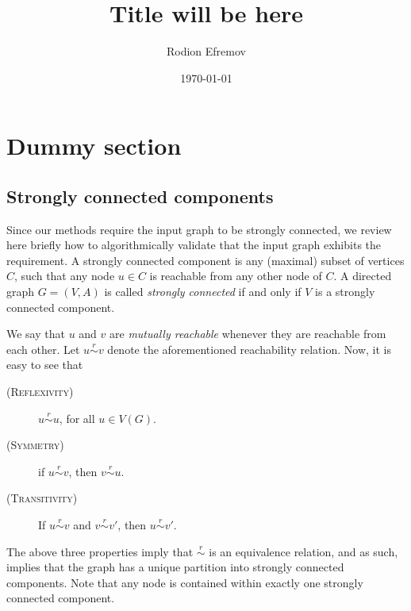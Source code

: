 \documentclass[english]{tktltiki2}
\title{Title will be here}
\author{Rodion Efremov}
\date{\today}
\theoremstyle{definition}
\theoremstyle{remark}
\begin{document}

\frontmatter      %

\maketitle        %
\makeabstract     %

\tableofcontents  %


\mainmatter       %

%
%
% 
%

\section*{Dummy section}

\subsection{Strongly connected components}
Since our methods require the input graph to be strongly connected, we review here briefly how to algorithmically validate that the input graph exhibits the requirement. A strongly connected component is any (maximal) subset of vertices $C$, such that any node $u \in C$ is reachable from any other node of $C$. A directed graph $G = (V, A)$ is called \textit{strongly connected} if and only if $V$ is a strongly connected component.

We say that $u$ and $v$ are \textit{mutually reachable} whenever they are reachable from each other. Let $u \overset{r}{\sim} v$ denote the aforementioned reachability relation. Now, it is easy to see that
\begin{description}
\item[\textsc{(Reflexivity)}]  $u \overset{r}{\sim} u$, for all $u \in V(G)$.
\item[\textsc{(Symmetry)}] if  $u \overset{r}{\sim} v$, then $v \overset{r}{\sim} u$.
\item[\textsc{(Transitivity)}] If $u \overset{r}{\sim} v$ and $v \overset{r}{\sim} v'$, then $u \overset{r}{\sim} v'$.
\end{description}
The above three properties imply that $\overset{r}{\sim}$ is an equivalence relation, and as such, implies that the graph has a unique partition into strongly connected components. Note that any node is contained within exactly one strongly connected component.
\end{document}
